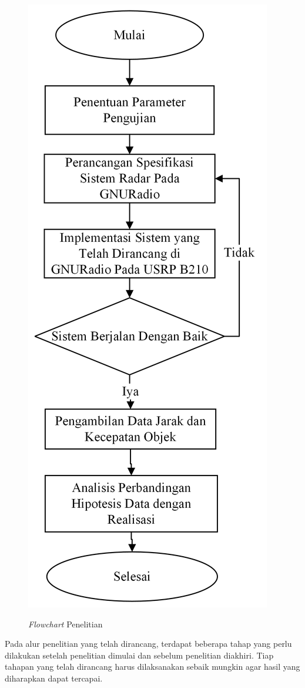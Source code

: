  \begin{figure}
	\begin{center}
		\includegraphics[scale=0.65]{pics/bab3/FlowchartSempro.png} 
		\label{img:flowchart}
		\caption[\textit{Flowchart} Penelitian]{\textit{Flowchart} Penelitian}
	\end{center}
\end{figure}
Pada alur penelitian yang telah dirancang, terdapat beberapa tahap yang perlu dilakukan setelah penelitian dimulai dan sebelum penelitian diakhiri. Tiap tahapan yang telah dirancang harus dilaksanakan sebaik mungkin agar hasil yang diharapkan dapat tercapai.
	
